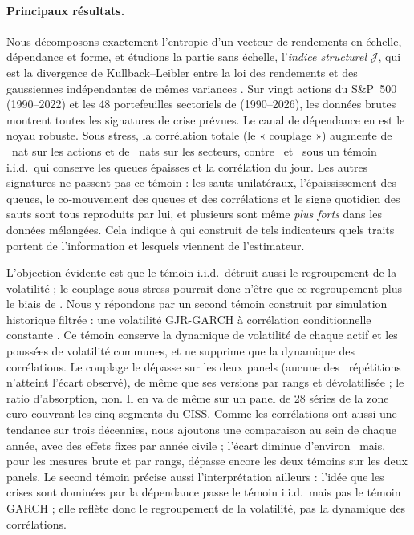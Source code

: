 \documentclass[12pt]{article}
\theoremstyle{definition}
\newcommand{\JJ}{\mathcal{J}}
\begin{document}
\begin{doublespace}
\paragraph{Principaux résultats.} Nous décomposons exactement l'entropie d'un
vecteur de rendements en échelle, dépendance et forme, et étudions la partie
sans échelle, l'\emph{indice structurel} $\JJ$, qui est la divergence de
Kullback--Leibler entre la loi des rendements et des gaussiennes indépendantes
de mêmes variances \citep{cardoso2003}. Sur vingt actions du S\&P~500
(1990--2022) et les 48 portefeuilles sectoriels de \citet{french2026}
(1990--2026), les données brutes montrent toutes les signatures de crise
prévues. Le canal de dépendance en est le noyau robuste. Sous stress, la
corrélation totale (le « couplage ») augmente de \qCplSpObs~nat sur les
actions et de \qCplFfObs~nats sur les secteurs, contre \qCplSpIid\ et \qCplFfIid\
sous un témoin i.i.d.\ qui conserve les queues épaisses et la corrélation du
jour. Les autres signatures ne passent pas ce témoin : les sauts unilatéraux,
l'épaississement des queues, le co-mouvement des queues et des corrélations et
le signe quotidien des sauts sont tous reproduits par lui, et plusieurs sont
même \emph{plus forts} dans les données mélangées. Cela indique à qui
construit de tels indicateurs quels traits portent de l'information et
lesquels viennent de l'estimateur.

L'objection évidente est que le témoin i.i.d.\ détruit aussi le regroupement
de la volatilité ; le couplage sous stress pourrait donc n'être que ce
regroupement plus le biais de \citet{forbes2002}. Nous y répondons par un
second témoin construit par simulation historique filtrée
\citep{baroneadesi1999} : une volatilité GJR-GARCH \citep{gjr1993} à
corrélation conditionnelle constante \citep{bollerslev1990}. Ce témoin
conserve la dynamique de volatilité de chaque actif et les poussées de
volatilité communes, et ne supprime que la dynamique des corrélations. Le
couplage le dépasse sur les deux panels (aucune des \nRep\ répétitions
n'atteint l'écart observé), de même que ses versions par rangs et
dévolatilisée ; le ratio d'absorption, non. Il en va de même sur un panel de
28 séries de la zone euro couvrant les cinq segments du CISS. Comme les
corrélations ont aussi une tendance sur trois décennies, nous ajoutons une
comparaison au sein de chaque année, avec des effets fixes par année civile ;
l'écart diminue d'environ \gnSpFeShrink\ mais, pour les mesures brute et par
rangs, dépasse encore les deux témoins sur les deux panels. Le second témoin
précise aussi l'interprétation ailleurs : l'idée que les crises sont dominées par la
dépendance passe le témoin i.i.d.\ mais pas le témoin GARCH ; elle reflète
donc le regroupement de la volatilité, pas la dynamique des corrélations.


\end{doublespace}
\end{document}
